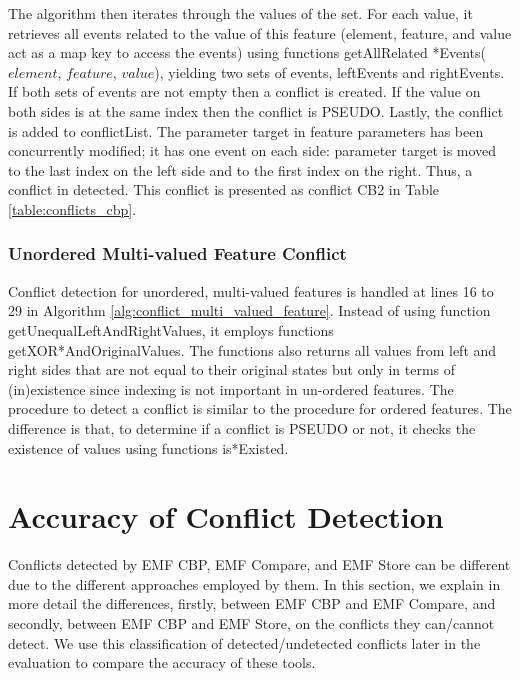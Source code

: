 The algorithm then iterates through the values of the set. For each value, it retrieves all events related to the value of this feature (element, feature, and value act as a map key to access the events) using functions \textsf{getAllRelated *Events($element$, $feature$, $value$)}, yielding two sets of events, \textsf{leftEvents} and \textsf{rightEvents}. If both sets of events are not empty then a conflict is created. If the value on both sides is at the same index then the conflict is \textsf{PSEUDO}. Lastly, the conflict is added to \textsf{conflictList}. The parameter \textsf{target} in feature \textsf{parameters} has been concurrently modified; it has one event on each side: parameter \textsf{target} is moved to the last index on the left side and to the first index on the right. Thus, a conflict in detected. This conflict is presented as conflict \textsf{CB2} in Table \ref{table:conflicts_cbp}.


\subsubsection{Unordered Multi-valued Feature Conflict} 
\label{sec:unordered_conflict}
Conflict detection for unordered, multi-valued features is handled at lines 16 to 29 in Algorithm \ref{alg:conflict_multi_valued_feature}. Instead of using function \textsf{getUnequalLeftAndRightValues}, it employs functions \textsf{getXOR*AndOriginalValues}. The functions also returns all values from left and right sides that are not equal to their original states but only in terms of (in)existence since indexing is not important in un-ordered features. The procedure to detect a conflict is similar to the procedure for ordered features. The difference is that, to determine if a conflict is \textsf{PSEUDO} or not, it checks the existence of values using functions \textsf{is*Existed}.

\section{Accuracy of Conflict Detection}
\label{sec:accuracy_of_conflict_detection}
Conflicts detected by EMF CBP, EMF Compare, and EMF Store can be different due to the different approaches employed by them. In this section, we explain in more detail the differences, firstly, between EMF CBP and EMF Compare, and secondly, between EMF CBP and EMF Store, on the conflicts they can/cannot detect. We use this classification of detected/undetected conflicts later in the evaluation to compare the accuracy of these tools.

